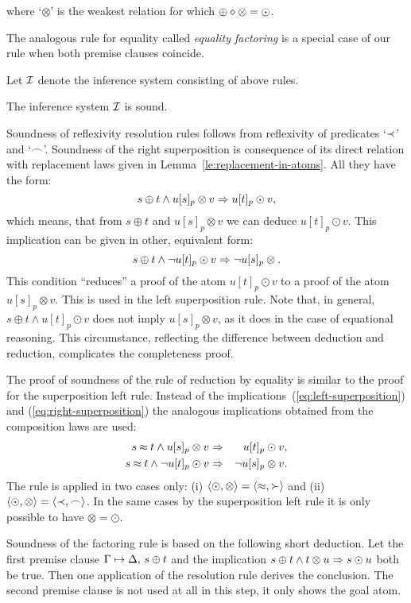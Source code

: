 where `$\otimes$' is the weakest relation for which \(\oplus\diamond\otimes=\odot\).

The analogous rule for equality called {\em equality factoring} \cite{BG,S-A}
is a special case of our rule when both premise clauses coincide. 

Let $\mbox{$\cal I$}$ denote the inference system consisting of above rules. 
\begin{THEOREM} \label{th:soundness}
The inference system $\mbox{$\cal I$}$ is sound.
\end{THEOREM}
\begin{PROOF}
Soundness of reflexivity resolution rules follows from reflexivity of
predicates `$\mathbin{\prec}$' and `$\mathbin{\frown}$'. Soundness of the right superposition is
consequence of its direct relation with replacement laws given in
Lemma~\ref{le:replacement-in-atoms}. All they have the form:
\begin{equation} \label {eq:right-superposition}
s\oplus t\land u[s]_p\otimes v\mathrel\Rightarrow u[t]_p\odot v,
\end{equation}
which means, that from \(s\oplus t\) and \( u[s]_p\otimes v\) we can deduce
\(u[t]_p\odot v\). 
This implication can be given in other, equivalent form:
\begin{equation} \label {eq:left-superposition}
s\oplus t\land \neg u[t]_p\odot v \mathrel\Rightarrow \neg  u[s]_p\otimes.
\end{equation}
This condition ``reduces'' a proof of the atom \(u[t]_p\odot v\) to a proof of
the atom \(u[s]_p\otimes v\). This is used in the left superposition rule.
Note that, in general, \(s\oplus t\land u[t]_p\odot v\) does not imply
 \(u[s]_p\otimes v\), as it does in the case of equational reasoning.
This circumstance, reflecting the difference between deduction and
reduction, complicates the completeness proof.

The proof of soundness of the rule of reduction by equality is similar to 
the proof for the superposition left rule. 
Instead of the implications~(\ref {eq:left-superposition}) and
(\ref {eq:right-superposition}) the analogous implications obtained from 
the composition laws are used:
\begin{eqnarray*}
s\mathbin{\approx} t\land u[s]_p\otimes v &\mathrel\Rightarrow & u[t]_p\odot v,\\
s\mathbin{\approx} t\land\neg u[t]_p\odot v &\mathrel\Rightarrow &\neg u[s]_p\otimes v.
\end{eqnarray*}
The rule is applied in two cases only: (i) \(\langle\odot, \otimes\rangle = \langle\mathbin{\approx},
\mathbin{\succ}\rangle\) and (ii) \(\langle\odot, \otimes\rangle = \langle\mathbin{\prec}, \mathbin{\frown}\rangle\). In the same cases
by the superposition left rule it is only possible to have
\(\otimes=\odot\).

Soundness of the factoring rule is based on the following short deduction.
Let the first premise clause \(\Gamma\mathrel{\mapsto} \Delta,\,s\oplus t\) and the
implication \(s\oplus t\land t\otimes u\mathrel\Rightarrow s\odot u\) both be true. Then one
application of the resolution rule derives the conclusion.  The second premise
clause is not used at all in this step, it only shows the goal atom.
\end{PROOF}

